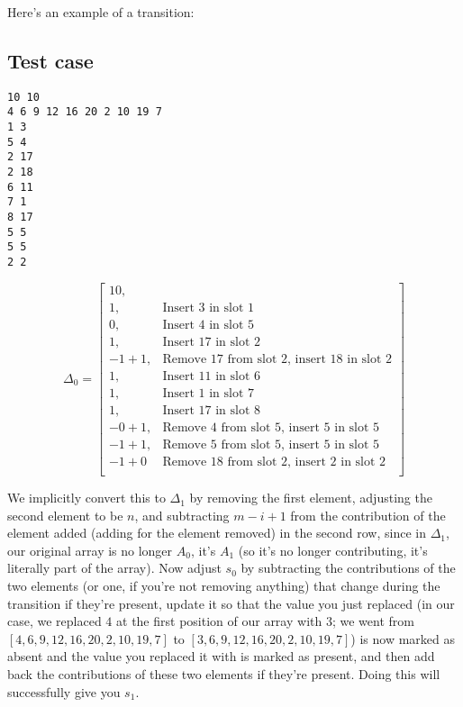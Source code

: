 \documentclass{article}
\begin{document}
Here's an example of a transition:
\subsection{Test case}
\begin{verbatim}
10 10
4 6 9 12 16 20 2 10 19 7
1 3
5 4
2 17
2 18
6 11
7 1
8 17
5 5
5 5
2 2
\end{verbatim}

$$
\Delta_0 = \left[
\begin{array}{ll}
10, \\
1, & \text{{Insert 3 in slot 1}} \\
0, & \text{{Insert 4 in slot 5}} \\
1, & \text{{Insert 17 in slot 2}} \\
-1+1, & \text{{Remove 17 from slot 2, insert 18 in slot 2}} \\
1, & \text{{Insert 11 in slot 6}} \\
1, & \text{{Insert 1 in slot 7}} \\
1, & \text{{Insert 17 in slot 8}} \\
-0+1, & \text{{Remove 4 from slot 5, insert 5 in slot 5}} \\
-1+1, & \text{{Remove 5 from slot 5, insert 5 in slot 5}} \\
-1+0 & \text{{Remove 18 from slot 2, insert 2 in slot 2}} \\
\end{array}
\right]
$$

We implicitly convert this to $\Delta_1$ by removing the first element, adjusting the second element to be $n$, and subtracting $m-i+1$ from the contribution of the element added (adding for the element removed) in the second row, since in $\Delta_1$, our original array is no longer $A_0$, it's $A_1$ (so it's no longer contributing, it's literally part of the array). Now adjust $s_0$ by subtracting the contributions of the two elements (or one, if you're not removing anything) that change during the transition if they're present, update it so that the value you just replaced (in our case, we replaced $4$ at the first position of our array with $3$; we went from $[4,6,9,12,16,20,2,10,19,7]$ to $[3,6,9,12,16,20,2,10,19,7]$) is now marked as absent and the value you replaced it with is marked as present, and then add back the contributions of these two elements if they're present. Doing this will successfully give you $s_1$.
\end{document}
